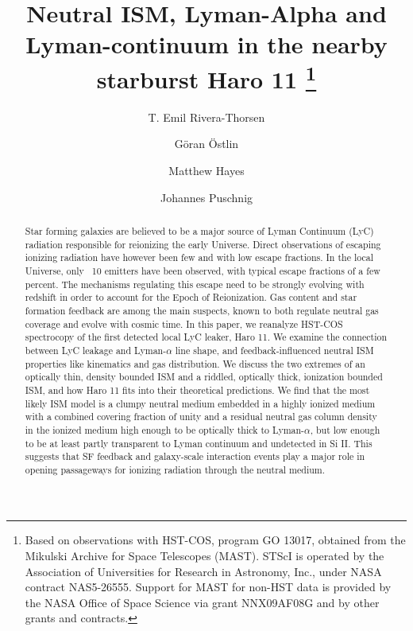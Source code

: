 \documentclass[twocolumn,]{aastex61}
\begin{document}
\title{Neutral ISM, Lyman-Alpha and Lyman-continuum in the nearby starburst Haro
11 \footnote{Based on observations with HST-COS, program GO 13017, obtained from
the Mikulski Archive for Space Telescopes (MAST). STScI is operated by the
Association of Universities for Research in Astronomy, Inc., under NASA contract
NAS5-26555. Support for MAST for non-HST data is provided by the NASA Office of
Space Science via grant NNX09AF08G and by other grants and contracts.} }


\author{T. Emil Rivera-Thorsen}
\author{Göran Östlin}
\author{Matthew Hayes}
\author{Johannes Puschnig}


\begin{abstract} 
		
Star forming galaxies are believed to be a major source of Lyman Continuum (LyC)
radiation responsible for reionizing the early Universe. Direct observations of
escaping ionizing radiation have however been few and with low escape fractions.
In the local Universe, only ~10 emitters have been observed, with typical escape
fractions of a few percent. The mechanisms regulating this escape need to be
strongly evolving with redshift in order to account for the Epoch of
Reionization. Gas content and star formation feedback are among the main
suspects, known to both regulate neutral gas coverage and evolve with cosmic
time. In this paper, we reanalyze HST-COS spectrocopy of the first detected
local LyC leaker, Haro 11. We examine the connection between LyC leakage and
Lyman-$\alpha$ line shape, and feedback-influenced neutral ISM properties like
kinematics and gas distribution. We discuss the two extremes of an optically
thin, density bounded ISM and a riddled, optically thick, ionization bounded
ISM, and how Haro 11 fits into their theoretical predictions.  We find that the
most likely ISM model is a clumpy neutral medium embedded in a highly ionized
medium with a combined covering fraction of unity and a residual neutral gas
column density in the ionized medium high enough to be optically thick to
Lyman-$\alpha$, but low enough to be at least partly transparent to Lyman
continuum and undetected in Si II. This suggests that SF feedback and
galaxy-scale interaction events play a major role in opening passageways for
ionizing radiation through the neutral medium. 

\end{abstract}
\end{document}

